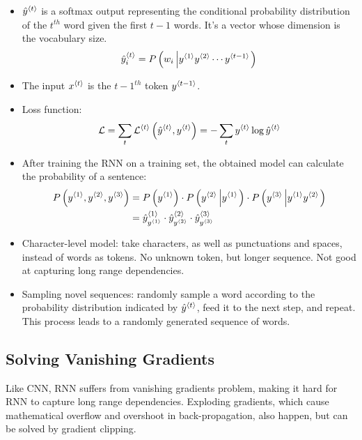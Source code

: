\begin{itemize}
  \item $\hat{y}^{\left\langle t\right\rangle}$ is a softmax output representing the conditional probability distribution of the $t^{th}$ word given the first $t-1$ words. It's a vector whose dimension is the vocabulary size.
  \[\hat{y}^{\left\langle t\right\rangle}_i=P\left(w_i\left\vert y^{\left\langle 1\right\rangle}y^{\left\langle 2\right\rangle}\cdots y^{\left\langle t-1\right\rangle}\right.\right)\]
  \item The input $x^{\left\langle t\right\rangle}$ is the ${t-1}^{th}$ token $y^{\left\langle t-1\right\rangle}$.
  \item Loss function:
  \[\mathcal{L}=\displaystyle\sum_{t}\mathcal{L}^{\left\langle t\right\rangle}\left(\hat{y}^{\left\langle t\right\rangle},y^{\left\langle t\right\rangle}\right)=-\displaystyle\sum_{t}y^{\left\langle t\right\rangle}\log\hat{y}^{\left\langle t\right\rangle}\]
  \item After training the RNN on a training set, the obtained model can calculate the probability of a sentence:
  \begin{align*}
    P\left(y^{\left\langle 1\right\rangle},y^{\left\langle 2\right\rangle},y^{\left\langle 3\right\rangle}\right)&=P\left(y^{\left\langle 1\right\rangle}\right)\cdot P\left(y^{\left\langle 2\right\rangle}\left\vert y^{\left\langle 1\right\rangle}\right.\right)\cdot P\left(y^{\left\langle 3\right\rangle}\left\vert y^{\left\langle 1\right\rangle}y^{\left\langle 2\right\rangle}\right.\right)\\
    &=\hat{y}^{\left\langle 1\right\rangle}_{y^{\left\langle 1\right\rangle}}\cdot\hat{y}^{\left\langle 2\right\rangle}_{y^{\left\langle 2\right\rangle}}\cdot\hat{y}^{\left\langle 3\right\rangle}_{y^{\left\langle 3\right\rangle}}
  \end{align*}
  \item Character-level model: take characters, as well as punctuations and spaces, instead of words as tokens. No unknown token, but longer sequence. Not good at capturing long range dependencies.
  \item Sampling novel sequences: randomly sample a word according to the probability distribution indicated by $\hat{y}^{\left\langle t\right\rangle}$, feed it to the next step, and repeat. This process leads to a randomly generated sequence of words.
\end{itemize}
\subsection{Solving Vanishing Gradients}
Like CNN, RNN suffers from vanishing gradients problem, making it hard for RNN to capture long range dependencies. Exploding gradients, which cause mathematical overflow and overshoot in back-propagation, also happen, but can be solved by gradient clipping.
